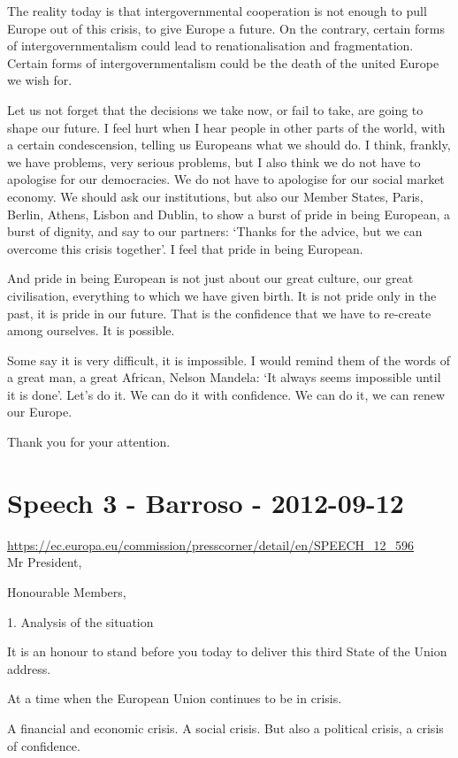 \documentclass[a4paper,11pt]{article}
\begin{document}
The reality today is that intergovernmental cooperation is not enough to pull Europe out of this crisis, to give Europe a future. On the contrary, certain forms of intergovernmentalism could lead to renationalisation and fragmentation. Certain forms of intergovernmentalism could be the death of the united Europe we wish for.

Let us not forget that the decisions we take now, or fail to take, are going to shape our future. I feel hurt when I hear people in other parts of the world, with a certain condescension, telling us Europeans what we should do. I think, frankly, we have problems, very serious problems, but I also think we do not have to apologise for our democracies. We do not have to apologise for our social market economy. We should ask our institutions, but also our Member States, Paris, Berlin, Athens, Lisbon and Dublin, to show a burst of pride in being European, a burst of dignity, and say to our partners: ‘Thanks for the advice, but we can overcome this crisis together'. I feel that pride in being European.

And pride in being European is not just about our great culture, our great civilisation, everything to which we have given birth. It is not pride only in the past, it is pride in our future. That is the confidence that we have to re-create among ourselves. It is possible.

Some say it is very difficult, it is impossible. I would remind them of the words of a great man, a great African, Nelson Mandela: ‘It always seems impossible until it is done'. Let's do it. We can do it with confidence. We can do it, we can renew our Europe.

Thank you for your attention.
 \newpage\section{Speech 3 - Barroso - 2012-09-12}
\url{https://ec.europa.eu/commission/presscorner/detail/en/SPEECH_12_596}\\[3mm]
Mr President,

Honourable Members,

1. Analysis of the situation

It is an honour to stand before you today to deliver this third State of the Union address.

At a time when the European Union continues to be in crisis.

A financial and economic crisis. A social crisis. But also a political crisis, a crisis of confidence.
\end{document}
